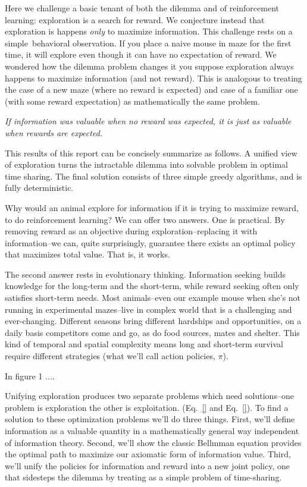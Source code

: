 \documentclass[9pt,twocolumn,twoside]{pnas-new}
\begin{document}
Here we challenge a basic tenant of both the dilemma and of reinforcement learning: exploration is a search for reward. We conjecture instead that exploration is happens \textit{only} to maximize information. This challenge rests on a simple behavioral observation. If you place a naive mouse in maze for the first time, it will explore even though it can have no expectation of reward. We wondered how the dilemma problem changes it you suppose exploration  always happens to maximize information (and not reward). This is analogous to treating the case of a new maze (where no reward is expected) and case of a familiar one (with some reward expectation) as mathematically the same problem. 

\textit{If information was valuable when no reward was expected, it is just as valuable when rewards are expected.}

This results of this report can be concisely summarize as follows. A unified view of exploration turns the intractable dilemma into solvable problem in optimal time sharing. The final solution consists of three simple greedy algorithms, and is fully deterministic. 

Why would an animal explore for information if it is trying to maximize reward, to do reinforcement learning? We can offer two answers. One is practical. By removing reward as an objective during exploration--replacing it with information--we can, quite surprisingly, guarantee there exists an optimal policy that maximizes total value. That is, it works.

The second answer rests in evolutionary thinking. Information seeking builds knowledge for the long-term and the short-term, while reward seeking often only satisfies short-term needs. Most animals--even our example mouse when she's not running in experimental mazes--live in complex world that is a challenging and ever-changing. Different seasons bring different hardships and opportunities, on a daily basis competitors come and go, as do food sources, mates and shelter. This kind of temporal and spatial complexity means long and short-term survival require different strategies (what we'll call action policies, $\pi$). 

In figure 1 ....

Unifying exploration produces two separate problems which need solutions--one problem is exploration the other is exploitation. (Eq.~\ref{} and Eq.~\ref{}). To find a solution to these optimization problems we'll do three things. First, we'll define information as a valuable quantity in a mathematically general way independent of information theory. Second, we'll show the classic Bellmman equation provides the optimal path to maximize our axiomatic form of information value. Third, we'll unify the policies for information and reward into a new joint policy, one that sidesteps the dilemma by treating as a simple problem of time-sharing.
\end{document}
